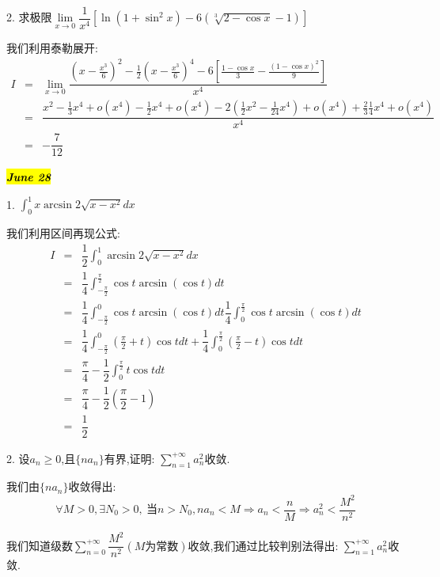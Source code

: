 2. 求极限$\lim\limits_{x\rightarrow 0}\dfrac{1}{x^4}\left[ \ln(1+\sin^2 x)-6(\sqrt[3]{2-\cos x}-1)\right] $
\begin{solution}
	
	我们利用泰勒展开: 
	\begin{eqnarray*}
		I&=&\lim\limits_{x\rightarrow 0}\dfrac{(x-\frac{x^3}{6})^2-\frac{1}{2}(x-\frac{x^3}{6})^4-6[\frac{1-\cos x}{3}-\frac{(1-\cos x)^2}{9}]}{x^4}\\
		&=&\dfrac{x^2-\frac{1}{3}x^4+o(x^4)-\frac{1}{2}x^4+o(x^4)-2(\frac{1}{2}x^2-\frac{1}{24}x^4)+o(x^4)+\frac{2}{3}\frac{1}{4}x^4+o(x^4)}{x^4}\\
		&=&-\dfrac{7}{12}
	\end{eqnarray*}
\end{solution}

\hl{\textbf{\textit{June 28}}}

1. $\int_{0}^{1}x\arcsin 2\sqrt{x-x^2}dx$
\begin{solution}
	
	我们利用区间再现公式: 
	\begin{eqnarray*}
		I&=&\dfrac{1}{2}\int_{0}^{1}\arcsin2\sqrt{x-x^2}dx\\
		&=&\dfrac{1}{4}\int_{-\frac{\pi}{2}}^{\frac{\pi}{2}}\cos t\arcsin (\cos t)dt\\
		&=&\dfrac{1}{4}\int_{-\frac{\pi}{2}}^{0}\cos t\arcsin (\cos t)dt\dfrac{1}{4}\int_{0}^{\frac{\pi}{2}}\cos t\arcsin (\cos t)dt\\
		&=&\dfrac{1}{4}\int_{-\frac{\pi}{2}}^{0}(\frac{\pi}{2}+t)\cos tdt+\dfrac{1}{4}\int_{0}^{\frac{\pi}{2}}(\frac{\pi}{2}-t)\cos tdt\\
		&=&\dfrac{\pi}{4}-\dfrac{1}{2}\int_{0}^{\frac{\pi}{2}}t\cos tdt\\
		&=&\dfrac{\pi}{4}-\dfrac{1}{2}(\dfrac{\pi}{2}-1)\\
		&=&\dfrac{1}{2}
	\end{eqnarray*}
	
	
\end{solution}

2. 设$a_{n}\geq 0$,且$\{na_{n}\}$有界,证明: $\sum\limits_{n=1}^{+\infty}a_{n}^2$收敛.
\begin{solution}
	
	我们由$\{na_{n}\}$收敛得出: 
	$$\forall M>0, \exists N_{0}>0,\ \text{当}n>N_{0}, na_{n}<M\Rightarrow a_{n}<\dfrac{n}{M}\Rightarrow a_{n}^2<\dfrac{M^2}{n^2} $$
	
	我们知道级数$\sum\limits_{n=0}^{+\infty}\dfrac{M^2}{n^2}(M\text{为常数})$收敛,我们通过比较判别法得出: $\sum\limits_{n=1}^{+\infty}a_{n}^2$收敛.
\end{solution}

